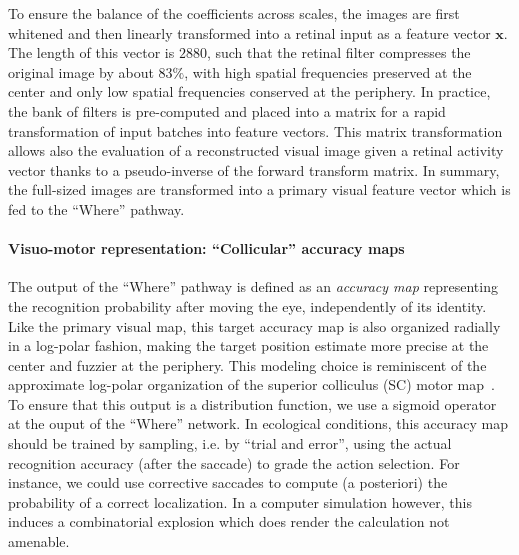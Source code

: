 To ensure the balance of the coefficients across scales, the images are first whitened and then linearly transformed into a retinal input as a feature vector $\boldsymbol{x}$.  The length of this vector is $2880$, such that the retinal filter compresses the original image by about $83\%$, with high spatial frequencies preserved at the center and only low spatial frequencies conserved at the periphery. In practice, the bank of filters is pre-computed and placed into a matrix for a rapid transformation of input batches into feature vectors. This matrix transformation allows also the evaluation of a reconstructed visual image given a retinal activity vector thanks to a pseudo-inverse of the forward transform matrix. In summary, the full-sized images are transformed into a primary visual feature vector which is fed to the ``Where'' pathway.

\paragraph{Visuo-motor representation: ``Collicular'' accuracy maps}
The output of the ``Where'' pathway is defined as an \emph{accuracy map} representing the recognition probability after moving the eye, independently of its identity. Like the primary visual map, this target accuracy map is also organized radially in a log-polar fashion, making the target position estimate more precise at the center and fuzzier at the periphery. This modeling choice is reminiscent of the approximate log-polar organization of the superior colliculus (SC) motor map~\cite{sparks1987sensory}. To ensure that this output is a distribution function, we use a sigmoid operator at the ouput of the ``Where'' network. In ecological conditions, this accuracy map should be trained by sampling, i.e. by ``trial and error'', using the actual recognition accuracy (after the saccade) to grade the action selection. For instance, we could use corrective saccades to compute (a posteriori) the probability of a correct localization. In a computer simulation however, this induces a combinatorial explosion which does render the calculation not amenable.


